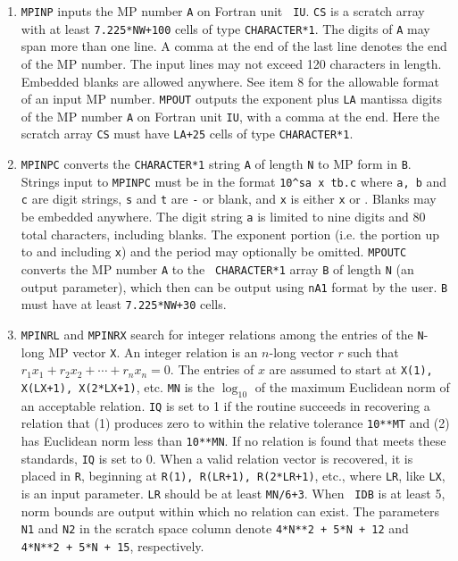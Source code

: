 \begin{enumerate}
\item {\tt MPINP} inputs the MP number {\tt A} on Fortran unit {\tt
IU}.  {\tt CS} is a scratch array with at least {\tt 7.225*NW+100}
cells of type {\tt CHARACTER*1}.  The digits of {\tt A} may span more
than one line.  A comma at the end of the last line denotes the end of
the MP number.  The input lines may not exceed 120 characters in
length.  Embedded blanks are allowed anywhere.  See item 8 for the
allowable format of an input MP number.  {\tt MPOUT} outputs the
exponent plus {\tt LA} mantissa digits of the MP number {\tt A} on
Fortran unit {\tt IU}, with a comma at the end.  Here the scratch
array {\tt CS} must have {\tt LA+25} cells of type {\tt CHARACTER*1}.

\item {\tt MPINPC} converts the {\tt CHARACTER*1} string {\tt A} of
length {\tt N} to MP form in {\tt B}.  Strings input to {\tt MPINPC}
must be in the format {\tt 10\^{ }sa x tb.c} where {\tt a, b} and {\tt
c} are digit strings, {\tt s} and {\tt t} are {\tt -} or blank, and
{\tt x} is either {\tt x} or {\tt *}.  Blanks may be embedded
anywhere.  The digit string {\tt a} is limited to nine digits and 80
total characters, including blanks.  The exponent portion (i.e. the
portion up to and including {\tt x}) and the period may optionally be
omitted.  {\tt MPOUTC} converts the MP number {\tt A} to the {\tt
CHARACTER*1} array {\tt B} of length {\tt N} (an output parameter),
which then can be output using {\tt nA1} format by the user. {\tt B}
must have at least {\tt 7.225*NW+30} cells.

\item {\tt MPINRL} and {\tt MPINRX} search for integer relations among
the entries of the {\tt N}-long MP vector {\tt X}.  An integer
relation is an $n$-long vector $r$ such that $r_1 x_1 + r_2 x_2 + \cdots
+ r_n x_n = 0$.  The entries of $x$ are assumed to start at {\tt X(1),
X(LX+1), X(2*LX+1)}, etc.  {\tt MN} is the $\log_{10}$ of the maximum
Euclidean norm of an acceptable relation.  {\tt IQ} is set to 1 if the
routine succeeds in recovering a relation that (1) produces zero to
within the relative tolerance {\tt 10**MT} and (2) has Euclidean norm
less than {\tt 10**MN}.  If no relation is found that meets these
standards, {\tt IQ} is set to 0.  When a valid relation vector is
recovered, it is placed in {\tt R}, beginning at {\tt R(1), R(LR+1),
R(2*LR+1)}, etc., where {\tt LR}, like {\tt LX}, is an input
parameter.  {\tt LR} should be at least {\tt MN/6+3}.  When {\tt
IDB} is at least 5, norm bounds are output within which no relation
can exist.  The parameters {\tt N1} and {\tt N2} in the scratch space
column denote {\tt 4*N**2 + 5*N + 12} and {\tt 4*N**2 + 5*N + 15},
respectively.


\end{enumerate}

